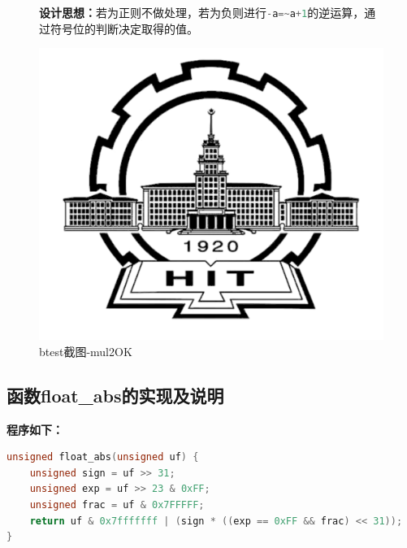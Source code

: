 \begin{figure}[H]
\begin{minipage}[c]{0.5\linewidth}
\textbf{设计思想：}若为正则不做处理，若为负则进行\lstinline[language=c]|-a=~a+1|的逆运算，通过符号位的判断决定取得的值。
\end{minipage}
\begin{minipage}[c]{0.4\linewidth}
\centering
\includegraphics[width=0.9\linewidth]{figures/HIT}
\caption{btest截图-mul2OK}
\label{fig:mul2OK}
\end{minipage}
\end{figure}

\subsection{函数float\_abs的实现及说明}
\textbf{程序如下：}

\begin{lstlisting}[language = c]
unsigned float_abs(unsigned uf) {
	unsigned sign = uf >> 31;
	unsigned exp = uf >> 23 & 0xFF;
	unsigned frac = uf & 0x7FFFFF;
	return uf & 0x7fffffff | (sign * ((exp == 0xFF && frac) << 31));
}
\end{lstlisting}

